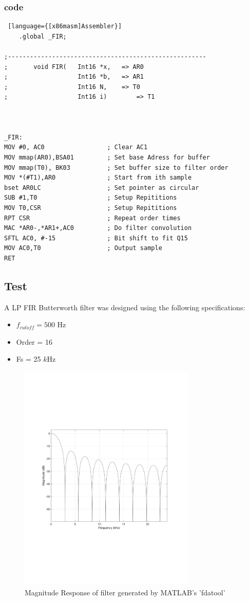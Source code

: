 \subsubsection{code}
\begin{lstlisting} [language={[x86masm]Assembler}]
	.global _FIR;

;------------------------------------------------------
;		void FIR(  	Int16 *x,	=> AR0
;			  		Int16 *b, 	=> AR1
;			   		Int16 N, 	=> T0
;			   		Int16 i)		=> T1



_FIR:	
MOV #0, AC0					; Clear AC1
MOV mmap(AR0),BSA01			; Set base Adress for buffer
MOV mmap(T0), BK03			; Set buffer size to filter order
MOV *(#T1),AR0				; Start from ith sample
bset AR0LC					; Set pointer as circular
SUB #1,T0					; Setup Repititions
MOV T0,CSR					; Setup Repititions
RPT CSR						; Repeat order times
MAC *AR0-,*AR1+,AC0 		; Do filter convolution
SFTL AC0, #-15				; Bit shift to fit Q15
MOV AC0,T0					; Output sample
RET
\end{lstlisting}

\subsection{Test}
A LP FIR Butterworth filter was designed using the following specifications:

\begin{itemize}
	\item $f_{cutoff} = 500$ Hz
	\item Order = 16
	\item Fs = 25 $k$Hz
\end{itemize}

\begin{figure} [H]
	\centering
	\includegraphics[width=0.75\textwidth]{../Journal/Code/Test/ButterworthLPFIR500hz}
	\caption{Magnitude Response of filter generated by MATLAB\textsuperscript{\textregistered}'s 'fdatool'}
	\label{Fig:FIR_filterfdatool}
\end{figure}

